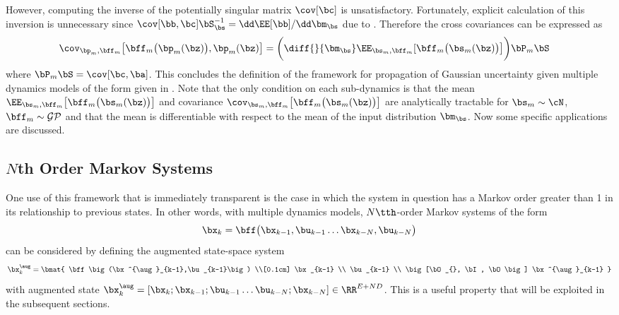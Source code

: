 However, computing the inverse of the potentially singular matrix $\cov[\bc]$ is unsatisfactory. Fortunately, explicit calculation of this inversion is unnecessary since $\cov[\bb,\bc] \bS_{\bs}^{-1} = \dd\EE[\bb]/\dd\bm_{\bs}$ due to . Therefore the cross covariances can be expressed as
\begin{align}
\cov_{\bp_m,\bff_m}\big[\bff_m\big(\bp_m(\bz)\big), \bp_m(\bz)\big]
&= \bigg(\diff{}{ \bm_{\bs} } \EE_{\bs_m,\bff_m}[\bff_m\big(\bs_m(\bz)\big)\big] \bigg) \bP_m \bS
\end{align}
where $\bP_m\bS = \cov[\bc,\ba]$. This concludes the definition of the framework for propagation of Gaussian uncertainty given multiple dynamics models of the form given in . Note that the only condition on each sub-dynamics is that the mean $\EE_{\bs_m,\bff_m}\big[\bff_m\big(\bs_m(\bz)\big)\big]$ and covariance $\cov_{\bs_m,\bff_m}\big[\bff_m\big(\bs_m(\bz)\big)\big]$ are analytically tractable for $\bs_m \sim \cN$, $\bff_m \sim \mathcal{GP}$ and that the mean is differentiable with respect to the mean of the input distribution $\bm_{\bs}$. Now some specific applications are discussed.


\subsection{$N$th Order Markov Systems} \label{sec:nonmarkov}
One use of this framework that is immediately transparent is the case in which the system in question has a Markov order greater than 1 in its relationship to previous states. In other words, with multiple dynamics models, $N\tth$-order Markov systems of the form
\begin{equation}
\bx_k = \bff\big(\bx_{k-1},\bu_{k-1}\dots\bx_{k-N},\bu_{k-N}\big)
\end{equation}
can be considered by defining the augmented state-space system
\begin{equation}
\bx^{\aug}_k = \bmat{ \bff\big(\bx^{\aug}_{k-1},\bu_{k-1}\big) \\[0.1cm] 
\bx_{k-1} \\
\bu_{k-1} \\
\big[\bO_{}, \bI, \bO\big] \bx^{\aug}_{k-1}
}
\end{equation}
with augmented state $\bx^{\aug}_k = [\bx_{k}; \bx_{k-1}; \bu_{k-1} \dots \bu_{k-N};  \bx_{k-N}] \in \RR^{E+ND}$. This is a useful property that will be exploited in the subsequent sections.







